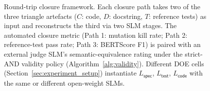 \begin{figure}[t]
  \caption{Round-trip closure framework. Each closure path takes two of the three
    triangle artefacts ($C$: code, $D$: docstring, $T$: reference tests) as
    input and reconstructs the third via two SLM stages. The automated closure
    metric (Path 1: mutation kill rate; Path 2: reference-test pass rate; Path 3:
    BERTScore F1) is paired with an external judge SLM's semantic-equivalence
    rating under the strict-AND validity policy (Algorithm~\ref{alg:validity}).
    Different DOE cells (Section~\ref{sec:experiment_setup}) instantiate
    $L_{\mathsf{spec}}$, $L_{\mathsf{test}}$, $L_{\mathsf{code}}$ with the same
    or different open-weight SLMs.}
  \label{fig:framework}
\end{figure}
